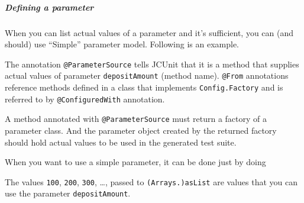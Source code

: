 \subparagraph{Defining a parameter}\label{defining-a-parameter}

When you can list actual values of a parameter and it's sufficient, you
can (and should) use ``Simple'' parameter model. Following is an
example.

\begin{Shaded}
\begin{Highlighting}[]

         \NormalTok{() \{}
           \NormalTok{(}\NormalTok{(}\NormalTok{, }\NormalTok{, }\NormalTok{, }\NormalTok{, }\NormalTok{, }\NormalTok{, -}\NormalTok{));}
        \NormalTok{\}}
\end{Highlighting}
\end{Shaded}

The annotation \texttt{@ParameterSource} tells JCUnit that it is a
method that supplies actual values of parameter \texttt{depositAmount}
(method name). \texttt{@From} annotations reference methods defined in a
class that implements \texttt{Config.Factory} and is referred to by
\texttt{@ConfiguredWith} annotation.

A method annotated with \texttt{@ParameterSource} must return a factory
of a parameter class. And the parameter object created by the returned
factory should hold actual values to be used in the generated test
suite.

When you want to use a simple parameter, it can be done just by doing

\begin{Shaded}
\begin{Highlighting}[]

           \NormalTok{(}\NormalTok{(}\NormalTok{, }\NormalTok{, }\NormalTok{, }\NormalTok{, }\NormalTok{, }\NormalTok{, -}\NormalTok{));}
\end{Highlighting}
\end{Shaded}

The values \texttt{100}, \texttt{200}, \texttt{300}, \ldots{}, passed to
\texttt{(Arrays.)asList} are values that you can use the parameter
\texttt{depositAmount}.

